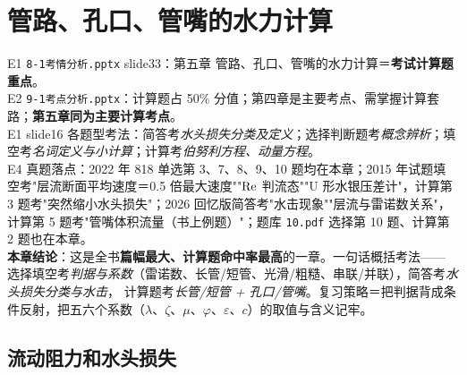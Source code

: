 \chapter{管路、孔口、管嘴的水力计算}

\begin{yijubox}
E1 \texttt{8-1考情分析.pptx} slide33：第五章 管路、孔口、管嘴的水力计算＝\textbf{考试计算题重点}。\\
E2 \texttt{9-1考点分析.pptx}：计算题占 50\% 分值；第四章是主要考点、需掌握计算套路；\textbf{第五章同为主要计算考点}。\\
E1 slide16 各题型考法：简答考\emph{水头损失分类及定义}；选择判断题考\emph{概念辨析}；填空考\emph{名词定义与小计算}；计算考\emph{伯努利方程、动量方程}。\\
E4 真题落点：2022 年 818 单选第 3、7、8、9、10 题均在本章；2015 年试题填空考"层流断面平均速度＝0.5 倍最大速度""$\mathrm{Re}$ 判流态""U 形水银压差计"，计算第 3 题考"突然缩小水头损失"；2026 回忆版简答考"水击现象""层流与雷诺数关系"，计算第 5 题考"管嘴体积流量（书上例题）"；题库 \texttt{10.pdf} 选择第 10 题、计算第 2 题也在本章。\\
\textbf{本章结论}：这是全书\textbf{篇幅最大、计算题命中率最高}的一章。一句话概括考法——
选择填空考\emph{判据与系数}（雷诺数、长管/短管、光滑/粗糙、串联/并联），简答考\emph{水头损失分类与水击}，
计算题考\emph{长管/短管 + 孔口/管嘴}。复习策略＝把判据背成条件反射，把五六个系数（$\lambda$、$\zeta$、$\mu$、$\varphi$、$\varepsilon$、$c$）的取值与含义记牢。
\end{yijubox}

\section{流动阻力和水头损失}

